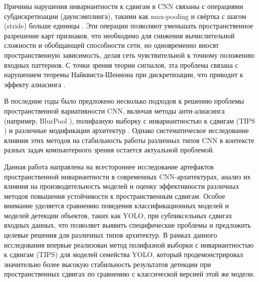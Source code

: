 Причины нарушения инвариантности к сдвигам в CNN связаны с операциями субдискретизации (даунсэмплинга), такими как max-pooling и свёртка с шагом (stride) больше единицы \cite{zhang2019making}. Эти операции позволяют уменьшать пространственное разрешение карт признаков, что необходимо для снижения вычислительной сложности и обобщающей способности сети, но одновременно вносят пространственную зависимость, делая сеть чувствительной к точному положению входных паттернов. С точки зрения теории сигналов, эта проблема связана с нарушением теоремы Найквиста-Шеннона при дискретизации, что приводит к эффекту алиасинга \cite{shannon1949communication}.

В последние годы было предложено несколько подходов к решению проблемы пространственной вариативности CNN, включая методы анти-алиасинга (например, BlurPool \cite{zhang2019making}), полифазную выборку с инвариантностью к сдвигам (TIPS \cite{chaman2021truly}) и различные модификации архитектур \cite{kayhan2020translation}. Однако систематическое исследование влияния этих методов на стабильность работы различных типов CNN в контексте разных задач компьютерного зрения остается актуальной проблемой.

Данная работа направлена на всестороннее исследование артефактов пространственной инвариантности в современных CNN-архитектурах, анализ их влияния на производительность моделей и оценку эффективности различных методов повышения устойчивости к пространственным сдвигам. Особое внимание уделяется сравнению поведения классификационных моделей и моделей детекции объектов, таких как YOLO, при субпиксельных сдвигах входных данных, что позволяет выявить специфические проблемы и предложить целевые решения для различных типов архитектур. В рамках данного исследования впервые реализован метод полифазной выборки с инвариантностью к сдвигам (TIPS) для моделей семейства YOLO, который продемонстрировал значительно более высокую стабильность результатов детекции при пространственных сдвигах по сравнению с классической версией этой же модели.

\newpage
